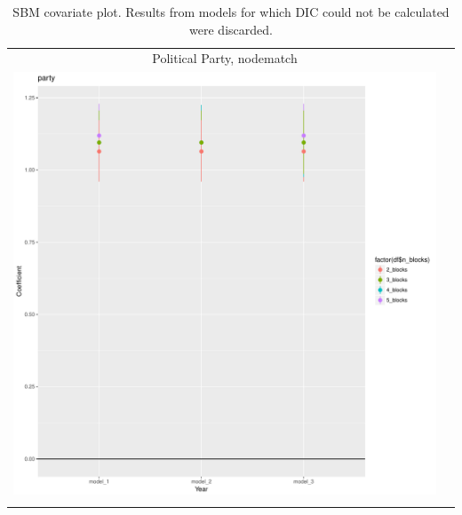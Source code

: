 \documentclass[fleqn,12pt]{wlscirep}
\begin{document}
\clearpage
\begin{longtable}[!h]{c@{\hskip 0cm}c}
Political Party, nodematch \\
\includegraphics[height=.75\textheight, clip=true, trim=.5cm .5cm 0cm .6cm]{figures/rl_plots1/party.pdf}   \\
\caption{\label{fig:SBM_plot_igig} SBM covariate plot. Results from models for which DIC could not be calculated were discarded.}
\end{longtable}




\end{document}
